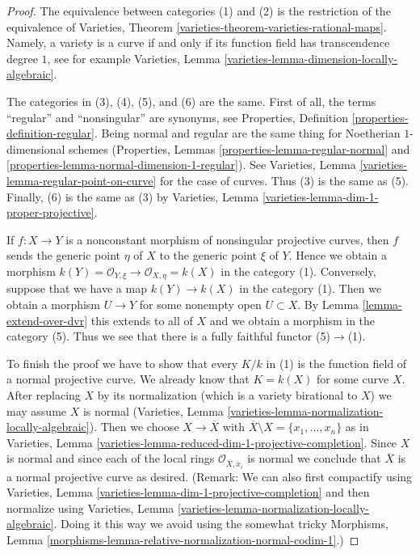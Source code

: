 \begin{proof}
The equivalence between categories (1) and (2) is the restriction of the
equivalence of
Varieties, Theorem \ref{varieties-theorem-varieties-rational-maps}.
Namely, a variety is a curve if and only if its function field has
transcendence degree $1$, see for example
Varieties, Lemma \ref{varieties-lemma-dimension-locally-algebraic}.

\medskip\noindent
The categories in (3), (4), (5), and (6) are the same. First of all, the
terms ``regular'' and ``nonsingular'' are synonyms, see
Properties, Definition \ref{properties-definition-regular}.
Being normal and regular are the same thing for Noetherian
$1$-dimensional schemes
(Properties, Lemmas \ref{properties-lemma-regular-normal} and
\ref{properties-lemma-normal-dimension-1-regular}). See
Varieties, Lemma \ref{varieties-lemma-regular-point-on-curve}
for the case of curves. Thus (3) is the same as (5). Finally, (6)
is the same as (3) by
Varieties, Lemma \ref{varieties-lemma-dim-1-proper-projective}.

\medskip\noindent
If $f : X \to Y$ is a nonconstant morphism of nonsingular projective curves,
then $f$ sends the generic point $\eta$ of $X$ to the generic point $\xi$ of
$Y$. Hence we obtain a morphism
$k(Y) = \mathcal{O}_{Y, \xi} \to \mathcal{O}_{X, \eta} = k(X)$
in the category (1). Conversely, suppose that we have a map
$k(Y) \to k(X)$ in the category (1). Then we obtain a morphism $U \to Y$
for some nonempty open $U \subset X$. By Lemma \ref{lemma-extend-over-dvr}
this extends to all of $X$ and we obtain a morphism in the category (5).
Thus we see that there is a fully faithful functor (5)$\to$(1).

\medskip\noindent
To finish the proof we have to show that every $K/k$ in (1)
is the function field of a normal projective curve.
We already know that $K = k(X)$ for some curve $X$.
After replacing $X$ by its normalization
(which is a variety birational to $X$)
we may assume $X$ is normal
(Varieties, Lemma \ref{varieties-lemma-normalization-locally-algebraic}).
Then we choose $X \to \overline{X}$ with
$\overline{X} \setminus X = \{x_1, \ldots, x_n\}$ as in
Varieties, Lemma \ref{varieties-lemma-reduced-dim-1-projective-completion}.
Since $X$ is normal and since each
of the local rings $\mathcal{O}_{\overline{X}, x_i}$ is normal
we conclude that $\overline{X}$ is a normal projective curve as desired.
(Remark: We can also first compactify using
Varieties, Lemma \ref{varieties-lemma-dim-1-projective-completion}
and then normalize using
Varieties, Lemma \ref{varieties-lemma-normalization-locally-algebraic}.
Doing it this way we avoid using the somewhat tricky
Morphisms, Lemma \ref{morphisms-lemma-relative-normalization-normal-codim-1}.)
\end{proof}

